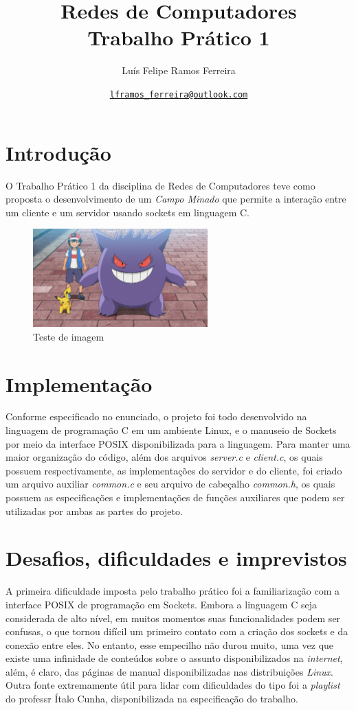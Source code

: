 \documentclass{article}
\title{Redes de Computadores \\ \large Trabalho Prático 1}
\author{Luís Felipe Ramos Ferreira}
\date{\href{mailto:lframos\_ferreira@outlook.com}{\texttt{lframos\_ferreira@outlook.com}}
}
\begin{document}
\maketitle

\section{Introdução}

O Trabalho Prático 1 da disciplina de Redes de Computadores teve como proposta
o desenvolvimento de um \textit{Campo Minado} que permite a interação entre um
cliente e um servidor usando sockets em linguagem C.

\begin{figure}[H]
      \centering
      \includegraphics[width=0.6\textwidth]{images/gengar.png}
      \caption{Teste de imagem}
\end{figure}

\section{Implementação}

Conforme especificado no enunciado, o projeto foi todo desenvolvido na
linguagem de programação C em um ambiente Linux, e o manuseio de Sockets por
meio da interface POSIX
disponibilizada para a linguagem. Para manter uma maior organização do código,
além dos arquivos \textit{server.c} e \textit{client.c}, os quais possuem
respectivamente, as implementações do servidor e do cliente,
foi criado um arquivo auxiliar \textit{common.c} e seu arquivo de cabeçalho
\textit{common.h}, os quais possuem as especificações e implementações de
funções auxiliares que podem ser utilizadas por ambas as partes do projeto.

\section{Desafios, dificuldades e imprevistos}

A primeira dificuldade imposta pelo trabalho prático foi a familiarização com a
interface POSIX de programação em Sockets. Embora a linguagem C seja
considerada de alto nível, em muitos momentos suas funcionalidades podem ser
confusas, o que tornou difícil um primeiro contato com a criação dos sockets e
da conexão entre eles. No entanto, esse empecilho não durou muito, uma vez que
existe uma infinidade de conteúdos sobre o assunto disponibilizados na
\textit{internet}, além, é
claro, das páginas de manual disponibilizadas nas distribuições \textit{Linux}.
Outra fonte extremamente útil para lidar com dificuldades do tipo foi a
\textit{playlist} do professr Ítalo Cunha, disponibilizada na especificação do
trabalho.
\end{document}
